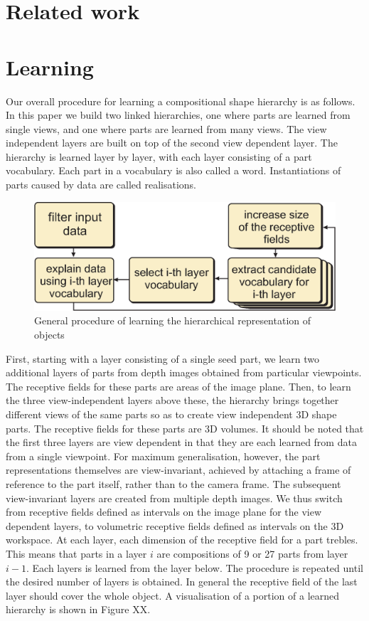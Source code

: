 \documentclass[letterpaper,10pt,conference]{ieeeconf}  %
\begin{document}
\section{Related work}

\section{Learning}

Our overall procedure for learning a compositional shape hierarchy is as follows. In this paper we build two linked hierarchies, one where parts are learned from single views, and one where parts are learned from many views. The view independent layers are built on top of the second view dependent layer. The hierarchy is learned layer by layer, with each layer consisting of a part vocabulary. Each part in a vocabulary is also called a word. Instantiations of parts caused by data are called realisations. 

\begin{figure}[t]
 \centering
\includegraphics[width=0.9\columnwidth]{../images/learningGeneral.eps}
\caption{General procedure of learning the hierarchical representation of objects}
 \label{hopProc}
\end{figure}

First, starting with a layer consisting of a single seed part, we learn two additional layers of parts from depth images obtained from particular viewpoints. The receptive fields for these parts are areas of the image plane. Then, to learn the three view-independent layers above these, the hierarchy brings together different views of the same parts so as to create view independent 3D shape parts. The receptive fields for these parts are 3D volumes. It should be noted that the first three layers are view dependent in that they are each learned from data from a single viewpoint. For maximum generalisation, however, the part representations themselves are view-invariant, achieved by attaching a frame of reference to the part itself, rather than to the camera frame.  The subsequent view-invariant layers are created from multiple depth images. We thus switch from receptive fields defined as intervals on the image plane for the view dependent layers, to volumetric receptive fields defined as intervals on the 3D workspace. At each layer, each dimension of the receptive field for a part trebles. This means that parts in a layer $i$ are compositions of 9 or 27 parts from layer $i-1$.  Each layers is learned from the layer below. The procedure is repeated until the desired number of layers is obtained. In general the receptive field of the last layer should cover the whole object. A visualisation of a portion of a learned hierarchy is shown in Figure XX.  
\end{document}

